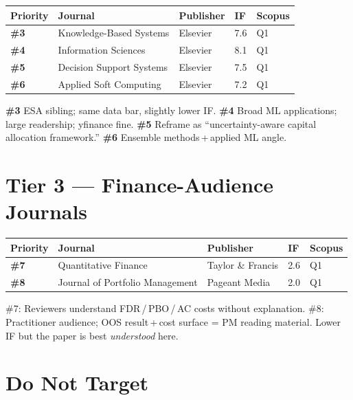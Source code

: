 \documentclass[11pt,a4paper]{article}
\begin{document}
\begin{tabularx}{\linewidth}{llXll}
\toprule
\textbf{Priority} & \textbf{Journal} & \textbf{Publisher} & \textbf{IF} & \textbf{Scopus}\\
\midrule
\textbf{\#3} & Knowledge-Based Systems   & Elsevier & 7.6 & Q1\\
\textbf{\#4} & Information Sciences      & Elsevier & 8.1 & Q1\\
\textbf{\#5} & Decision Support Systems  & Elsevier & 7.5 & Q1\\
\textbf{\#6} & Applied Soft Computing    & Elsevier & 7.2 & Q1\\
\bottomrule
\end{tabularx}

\vspace{0.5em}
{\small
\textbf{\#3} ESA sibling; same data bar, slightly lower IF.
\textbf{\#4} Broad ML applications; large readership; yfinance fine.
\textbf{\#5} Reframe as ``uncertainty-aware capital allocation framework.''
\textbf{\#6} Ensemble methods\,+\,applied ML angle.
}

\section*{\textcolor{tier3}{Tier 3 — Finance-Audience Journals}}

\begin{tabularx}{\linewidth}{llXll}
\toprule
\textbf{Priority} & \textbf{Journal} & \textbf{Publisher} & \textbf{IF} & \textbf{Scopus}\\
\midrule
\textbf{\#7} & Quantitative Finance         & Taylor \& Francis & 2.6 & Q1\\
\textbf{\#8} & Journal of Portfolio Management & Pageant Media & 2.0 & Q1\\
\bottomrule
\end{tabularx}

\vspace{0.5em}
{\small \#7: Reviewers understand FDR\,/\,PBO\,/\,AC costs without explanation.
\#8: Practitioner audience; OOS result\,+\,cost surface = PM reading material.
Lower IF but the paper is best \emph{understood} here.}

\section*{\textcolor{donot}{Do Not Target}}
\end{document}
